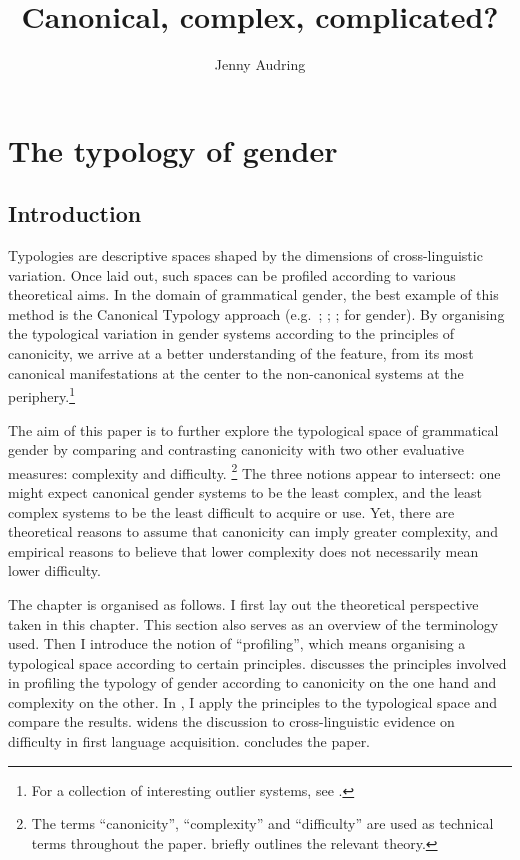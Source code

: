 \documentclass[output=collectionpaper]{langsci/langscibook}
\title{Canonical, complex, complicated?}
\author{%
Jenny Audring
\affiliation{Leiden University}
}%
\begin{document}
\section{The typology of gender}

\subsection{Introduction}

Typologies are descriptive spaces shaped by the dimensions of cross-linguistic variation. Once laid out, such spaces can be profiled according to various theoretical aims. In the domain of grammatical gender, the best example of this method is the Canonical Typology approach (e.g.\ \citealt{Corbett2006}; \citealt{Brown2013}; \citealt{Bond2019}; \citealt{Corbett2016} for gender). By organising the typological variation in gender systems according to the principles of canonicity, we arrive at a better understanding of the feature, from its most canonical manifestations at the center to the non-canonical systems at the periphery.\footnote{For a collection of interesting outlier systems, see \citet{Fedden2018}.}

The aim of this paper is to further explore the typological space of grammatical gender by comparing and contrasting canonicity with two other evaluative measures: complexity and difficulty.%
\footnote{The terms ``canonicity'', ``complexity'' and ``difficulty'' are used as technical terms throughout the paper.  briefly outlines the relevant theory.} %
The three notions appear to intersect: one might expect canonical gender systems to be the least complex, and the least complex systems to be the least difficult to acquire or use. Yet, there are theoretical reasons to assume that canonicity can imply greater complexity, and empirical reasons to believe that lower complexity does not necessarily mean lower difficulty.

The chapter is organised as follows. I first lay out the theoretical perspective taken in this chapter. This section also serves as an overview of the terminology used. Then I introduce the notion of ``profiling'', which means organising a typological space according to certain principles.  discusses the principles involved in profiling the typology of gender according to canonicity on the one hand and complexity on the other. In , I apply the principles to the typological space and compare the results.  widens the discussion to cross-linguistic evidence on difficulty in first language acquisition.  concludes the paper.
\end{document}

